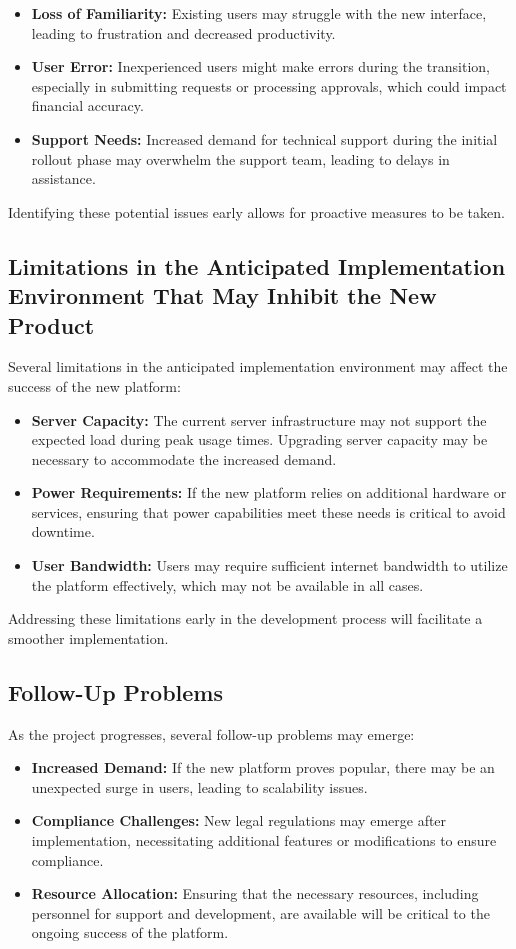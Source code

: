 \documentclass[12pt]{article}
\begin{document}
\begin{itemize}
    \item \textbf{Loss of Familiarity:} Existing users may struggle with the new interface, leading to frustration and decreased productivity.
    \item \textbf{User Error:} Inexperienced users might make errors during the transition, especially in submitting requests or processing approvals, which could impact financial accuracy.
    \item \textbf{Support Needs:} Increased demand for technical support during the initial rollout phase may overwhelm the support team, leading to delays in assistance.
\end{itemize}

Identifying these potential issues early allows for proactive measures to be taken.

\subsection{Limitations in the Anticipated Implementation Environment That May Inhibit the New Product}
Several limitations in the anticipated implementation environment may affect the success of the new platform:

\begin{itemize}
    \item \textbf{Server Capacity:} The current server infrastructure may not support the expected load during peak usage times. Upgrading server capacity may be necessary to accommodate the increased demand.
    \item \textbf{Power Requirements:} If the new platform relies on additional hardware or services, ensuring that power capabilities meet these needs is critical to avoid downtime.
    \item \textbf{User Bandwidth:} Users may require sufficient internet bandwidth to utilize the platform effectively, which may not be available in all cases.
\end{itemize}

Addressing these limitations early in the development process will facilitate a smoother implementation.

\subsection{Follow-Up Problems}
As the project progresses, several follow-up problems may emerge:

\begin{itemize}
    \item \textbf{Increased Demand:} If the new platform proves popular, there may be an unexpected surge in users, leading to scalability issues.
    \item \textbf{Compliance Challenges:} New legal regulations may emerge after implementation, necessitating additional features or modifications to ensure compliance.
    \item \textbf{Resource Allocation:} Ensuring that the necessary resources, including personnel for support and development, are available will be critical to the ongoing success of the platform.
\end{itemize}
\end{document}
